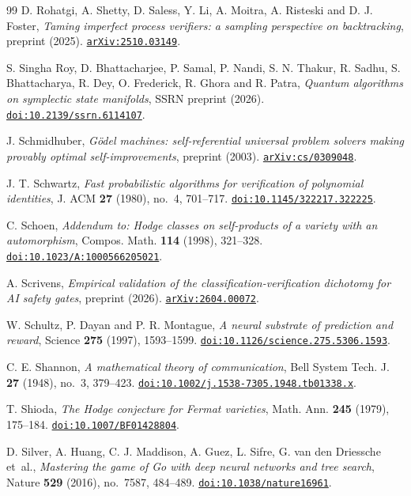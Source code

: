 \begin{thebibliography}{99}
D. Rohatgi, A. Shetty, D. Saless, Y. Li, A. Moitra, A. Risteski and D. J. Foster,
\emph{Taming imperfect process verifiers: a sampling perspective on backtracking},
preprint (2025).
\href{https://arxiv.org/abs/2510.03149}{\nolinkurl{arXiv:2510.03149}}.

S. Singha Roy, D. Bhattacharjee, P. Samal, P. Nandi, S. N. Thakur, R. Sadhu, S. Bhattacharya, R. Dey, O. Frederick, R. Ghora and R. Patra,
\emph{Quantum algorithms on symplectic state manifolds},
SSRN preprint (2026).
\href{https://doi.org/10.2139/ssrn.6114107}{\nolinkurl{doi:10.2139/ssrn.6114107}}.

J. Schmidhuber,
\emph{G\"odel machines: self-referential universal problem solvers making provably optimal self-improvements},
preprint (2003).
\href{https://arxiv.org/abs/cs/0309048}{\nolinkurl{arXiv:cs/0309048}}.

J. T. Schwartz,
\emph{Fast probabilistic algorithms for verification of polynomial identities},
J. ACM \textbf{27} (1980), no.~4, 701--717.
\href{https://doi.org/10.1145/322217.322225}{\nolinkurl{doi:10.1145/322217.322225}}.

C. Schoen,
\emph{Addendum to: Hodge classes on self-products of a variety with an automorphism},
Compos. Math. \textbf{114} (1998), 321--328.
\href{https://doi.org/10.1023/A:1000566205021}{\nolinkurl{doi:10.1023/A:1000566205021}}.

A. Scrivens,
\emph{Empirical validation of the classification-verification dichotomy for AI safety gates},
preprint (2026).
\href{https://arxiv.org/abs/2604.00072}{\nolinkurl{arXiv:2604.00072}}.

W. Schultz, P. Dayan and P. R. Montague,
\emph{A neural substrate of prediction and reward},
Science \textbf{275} (1997), 1593--1599.
\href{https://doi.org/10.1126/science.275.5306.1593}{\nolinkurl{doi:10.1126/science.275.5306.1593}}.

C. E. Shannon,
\emph{A mathematical theory of communication},
Bell System Tech. J. \textbf{27} (1948), no.~3, 379--423.
\href{https://doi.org/10.1002/j.1538-7305.1948.tb01338.x}{\nolinkurl{doi:10.1002/j.1538-7305.1948.tb01338.x}}.

T. Shioda,
\emph{The Hodge conjecture for Fermat varieties},
Math. Ann. \textbf{245} (1979), 175--184.
\href{https://doi.org/10.1007/BF01428804}{\nolinkurl{doi:10.1007/BF01428804}}.

D. Silver, A. Huang, C. J. Maddison, A. Guez, L. Sifre, G. van den Driessche et~al.,
\emph{Mastering the game of Go with deep neural networks and tree search},
Nature \textbf{529} (2016), no.~7587, 484--489.
\href{https://doi.org/10.1038/nature16961}{\nolinkurl{doi:10.1038/nature16961}}.


\end{thebibliography}
